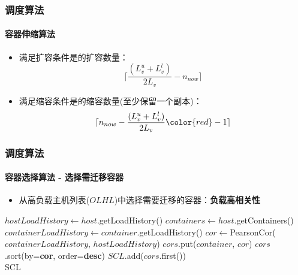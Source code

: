 \begin{frame}
\frametitle{调度算法}
\framesubtitle{容器伸缩算法}
\begin{itemize}
    \item 满足扩容条件是的扩容数量：
    \begin{equation}
        \lceil \frac{(L_v^u+L_v^l)}{2L_v} - n_{now} \rceil
    \end{equation}
    \item 满足缩容条件是的缩容数量(至少保留一个副本)：
    \begin{equation}
        \lceil n_{now} - \frac{(L_v^u+L_v^l)}{2L_v} {\color{red} - 1}\rceil
    \end{equation}
\end{itemize}
\end{frame}

\begin{frame}
\frametitle{调度算法}
\framesubtitle{容器选择算法 - 选择需迁移容器}
\begin{itemize}
    \item 从高负载主机列表($OLHL$)中选择需要迁移的容器：\textbf{负载高相关性}
\end{itemize}
\begin{algorithmic}[1]
      
    \State $hostLoadHistory \gets host$.getLoadHistory() 
    \State $containers \gets host$.getContainers()  
     
      \State $containerLoadHistory \gets container$.getLoadHistory()
      \State $cor \gets$PearsonCor($containerLoadHistory $, $hostLoadHistory$)
      \State $cors$.put($container$, $cor$)
    \EndFor
    \State $cors$.sort(by=\textbf{cor}, order=\textbf{desc}) 
    \State $SCL$.add($cors$.first())    
  \EndFor \\
  \Return SCL
\end{algorithmic}
\bigskip
\end{frame}

